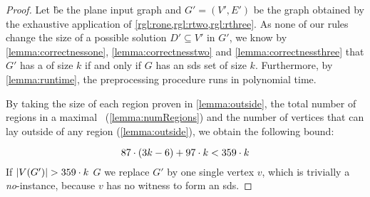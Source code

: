 \begin{proof}
    Let \G be the plane input graph and $G'=(V',E')$ be the graph obtained by the exhaustive application of \cref{rgl:rone,rgl:rtwo,rgl:rthree}.
    As none of our rules change the size of a possible solution $D' \subseteq V'$ in $G'$, we know by \cref{lemma:correctnessone}, \cref{lemma:correctnesstwo} and \cref{lemma:correctnessthree} that $G'$ has a \sdom of size $k$ if and only if $G$ has an sds set of size $k$.
    Furthermore, by \cref{lemma:runtime}, the preprocessing procedure runs in polynomial time.
    
    By taking the size of each region proven in \cref{lemma:outside}, the total number of regions in a maximal \dreg~(\cref{lemma:numRegions}) and the number of vertices that can lay outside of any region (\cref{lemma:outside}), we obtain the following bound:
    
    \begin{equation}
         87 \cdot (3k - 6) + 97 \cdot k  < 359 \cdot k
    \end{equation}
    \noindent If $\abs{V(G')} > 359 \cdot k$ $G$ we replace $G'$ by one single vertex $v$, which is trivially a \emph{no}-instance, because $v$ has no witness to form an sds.

\end{proof}
